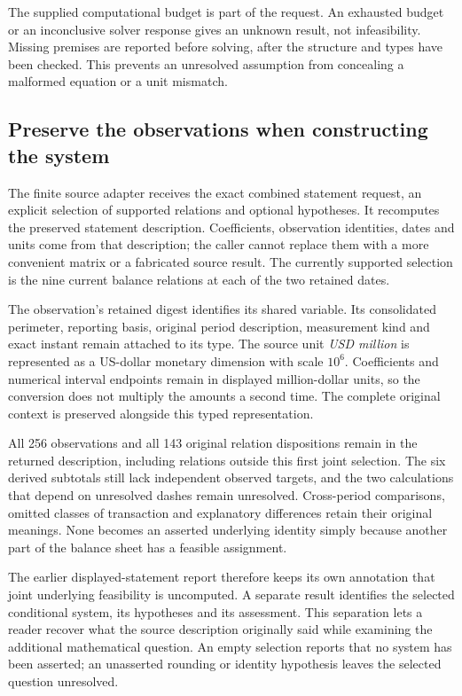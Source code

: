 The supplied computational budget is part of the request. An exhausted
budget or an inconclusive solver response gives an unknown result, not
infeasibility. Missing premises are reported before solving, after the
structure and types have been checked. This prevents an unresolved
assumption from concealing a malformed equation or a unit mismatch.

\subsection{Preserve the observations when constructing the system}

The finite source adapter  receives
the exact combined statement request, an explicit selection of supported
relations and optional hypotheses. It recomputes the preserved statement
description. Coefficients, observation identities, dates and units come from
that description; the caller cannot replace them with a more convenient
matrix or a fabricated source result. The currently supported selection is
the nine current balance relations at each of the two retained dates.

The observation's retained digest identifies its shared variable. Its
consolidated perimeter, reporting basis, original period description,
measurement kind and exact instant remain attached to its type. The source
unit \emph{USD million} is represented as a US-dollar monetary dimension
with scale \(10^6\). Coefficients and numerical interval endpoints remain
in displayed million-dollar units, so the conversion does not multiply
the amounts a second time. The complete original context is preserved
alongside this typed representation.

All 256 observations and all 143 original relation dispositions remain in
the returned description, including relations outside this first joint
selection. The six derived subtotals still lack independent observed targets,
and the two calculations that depend on unresolved dashes remain unresolved.
Cross-period comparisons, omitted classes of transaction and explanatory
differences retain their original meanings. None becomes an asserted
underlying identity simply because another part of the balance sheet has
a feasible assignment.

The earlier displayed-statement report therefore keeps its own annotation
that joint underlying feasibility is uncomputed. A separate result identifies
the selected conditional system, its hypotheses and its assessment. This
separation lets a reader recover what the source description originally
said while examining the additional mathematical question. An empty selection
reports that no system has been asserted; an unasserted rounding or identity
hypothesis leaves the selected question unresolved.

